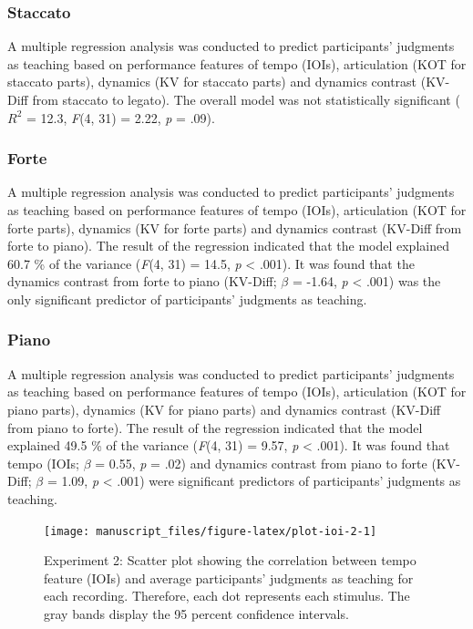 \documentclass[
  man,floatsintext]{apa6}
\begin{document}
\hypertarget{staccato-1}{%
\subsubsection{Staccato}\label{staccato-1}}

A multiple regression analysis was conducted to predict participants' judgments as teaching based on performance features of tempo (IOIs), articulation (KOT for staccato parts), dynamics (KV for staccato parts) and dynamics contrast (KV-Diff from staccato to legato). The overall model was not statistically significant (\(R^{2}\) = 12.3, \emph{F}(4, 31) = 2.22, \emph{p} = .09).

\hypertarget{forte-1}{%
\subsubsection{Forte}\label{forte-1}}

A multiple regression analysis was conducted to predict participants' judgments as teaching based on performance features of tempo (IOIs), articulation (KOT for forte parts), dynamics (KV for forte parts) and dynamics contrast (KV-Diff from forte to piano). The result of the regression indicated that the model explained 60.7 \% of the variance (\emph{F}(4, 31) = 14.5, \emph{p} \textless{} .001). It was found that the dynamics contrast from forte to piano (KV-Diff; \emph{\(\beta\)} = -1.64, \emph{p} \textless{} .001) was the only significant predictor of participants' judgments as teaching.

\hypertarget{piano-1}{%
\subsubsection{Piano}\label{piano-1}}

A multiple regression analysis was conducted to predict participants' judgments as teaching based on performance features of tempo (IOIs), articulation (KOT for piano parts), dynamics (KV for piano parts) and dynamics contrast (KV-Diff from piano to forte). The result of the regression indicated that the model explained 49.5 \% of the variance (\emph{F}(4, 31) = 9.57, \emph{p} \textless{} .001). It was found that tempo (IOIs; \emph{\(\beta\)} = 0.55, \emph{p} = .02) and dynamics contrast from piano to forte (KV-Diff; \emph{\(\beta\)} = 1.09, \emph{p} \textless{} .001) were significant predictors of participants' judgments as teaching.

\begin{figure}

{\centering \texttt{[image: manuscript\_files/figure-latex/plot-ioi-2-1]} 

}

\caption{\label{fig:ioi-2}Experiment 2: Scatter plot showing the correlation between tempo feature (IOIs) and average participants' judgments as teaching for each recording. Therefore, each dot represents each stimulus. The gray bands display the 95 percent confidence intervals.}\label{fig:plot-ioi-2}
\end{figure}
\end{document}
